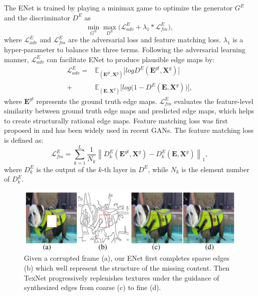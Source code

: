 The ENet is trained by playing a minimax game to optimize the generator $G^E$ and the discriminator $D^E$ as
\begin{equation}
	\label{eq:loss_e}
	\min\limits_{G^E} \max \limits_{D^E} \big(\mathcal{L}^E_{adv}+\lambda_1 * \mathcal{L}^E_{fm}\big),
\end{equation}
where $\mathcal{L}^E_{adv}$ and $\mathcal{L}^E_{fm}$ are the adversarial loss and feature matching loss. 
$\lambda_1$ is a hyper-parameter to balance the three terms.
%
Following the adversarial learning manner, $\mathcal{L}^E_{adv}$ can facilitate ENet to produce plausible edge maps by:
\begin{equation} \label{eq:edge_adver}
	\begin{aligned} 
		\mathcal{L}^E_{adv}  =&\mathbb{E}_{(\boldsymbol{E}^{gt},\boldsymbol{X}^{g})}\big[logD^E(\boldsymbol{E}^{gt},\boldsymbol{X}^{g})\big]\\ 
		+&\mathbb{E}_{(\boldsymbol{E},\boldsymbol{X}^{g})}\big[log\big(1-D^E ( \boldsymbol{E},\boldsymbol{X}^{g})\big)\big],
	\end{aligned}
\end{equation}
where $\boldsymbol{E}^{gt}$ represents the ground truth edge maps. $\mathcal{L}^E_{fm}$ evaluates the feature-level similarity between ground truth edge maps and predicted edge maps, which helps to create structurally rational edge maps. 
Feature matching loss was first proposed in \cite{wang2018high} and has been widely used in recent GANs.
The feature matching loss is defined as:
\begin{equation}
	\label{eq:edge_fm}
	\mathcal{L}^E_{fm}=\sum_{k=1}^L{\frac{1}{N_k}\left\| D^E_k(\boldsymbol{E}^{gt},\boldsymbol{X}^{g})- D^E_k(\boldsymbol{E},\boldsymbol{X}^{g})\right\|_1},
\end{equation}
where $D^E_k$ is the output of the $k$-th layer in $D^E$, while $N_k$ is the element number of $D^E_k$. 


\begin{figure}[t]
	\centering
	\includegraphics[width=1.0\columnwidth]{coars-fine} %
	\caption{Given a corrupted frame (a), our ENet first completes sparse edges (b) which well represent the structure of the missing content. Then TexNet progressively replenishes textures under the guidance of synthesized edges from coarse (c) to fine (d).}
	
	\label{fig:coarse-fine}
\end{figure}



